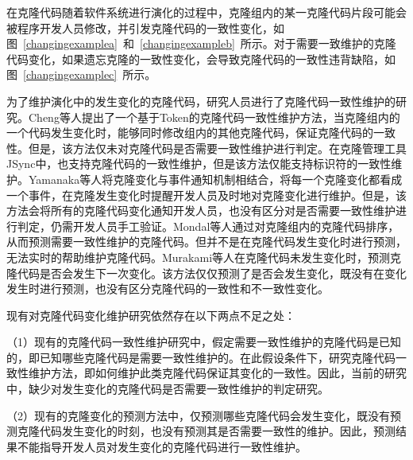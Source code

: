 在克隆代码随着软件系统进行演化的过程中，克隆组内的某一克隆代码片段可能会被程序开发人员修改，并引发克隆代码的一致性变化\cite{saha2011automatic}，如图~\ref{changingexamplea}~和~\ref{changingexampleb}~所示。对于需要一致维护的克隆代码变化，如果遗忘克隆的一致性变化，会导致克隆代码的一致性违背缺陷\cite{aversano2007clones,bettenburg2009empirical}，如图~\ref{changingexamplec}~所示。%


为了维护演化中的发生变化的克隆代码，研究人员进行了克隆代码一致性维护的研究。Cheng等人\cite{cheng2016rule}提出了一个基于Token的克隆代码一致性维护方法，当克隆组内的一个代码发生变化时，能够同时修改组内的其他克隆代码，保证克隆代码的一致性。但是，该方法仅未对克隆代码是否需要一致性维护进行判定。在克隆管理工具JSync\cite{nguyen2012clone}中，也支持克隆代码的一致性维护，但是该方法仅能支持标识符的一致性维护。Yamanaka等人\cite{yamanaka2013applying}将克隆变化与事件通知机制相结合，将每一个克隆变化都看成一个事件，在克隆发生变化时提醒开发人员及时地对克隆变化进行维护。但是，该方法会将所有的克隆代码变化通知开发人员，也没有区分对是否需要一致性维护进行判定，仍需开发人员手工验证。Mondal等人通过对克隆组内的克隆代码排序，从而预测需要一致性维护的克隆代码\cite{mondal2014prediction}。但并不是在克隆代码发生变化时进行预测，无法实时的帮助维护克隆代码。Murakami等人在克隆代码未发生变化时，预测克隆代码是否会发生下一次变化\cite{murakami2014predicting}。该方法仅仅预测了是否会发生变化，既没有在变化发生时进行预测，也没有区分克隆代码的一致性和不一致性变化。

现有对克隆代码变化维护研究依然存在以下两点不足之处：

（1）现有的克隆代码一致性维护研究中，假定需要一致性维护的克隆代码是已知的，即已知哪些克隆代码是需要一致性维护的。在此假设条件下，研究克隆代码一致性维护方法，即如何维护此类克隆代码保证其变化的一致性。因此，当前的研究中，缺少对发生变化的克隆代码是否需要一致性维护的判定研究。

（2）现有的克隆变化的预测方法中，仅预测哪些克隆代码会发生变化，既没有预测克隆代码发生变化的时刻，也没有预测其是否需要一致性的维护。因此，预测结果不能指导开发人员对发生变化的克隆代码进行一致性维护。

